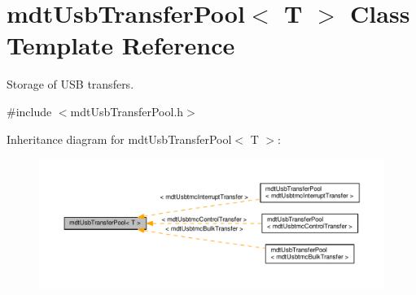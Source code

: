 \hypertarget{classmdt_usb_transfer_pool}{\section{mdt\-Usb\-Transfer\-Pool$<$ T $>$ Class Template Reference}
\label{classmdt_usb_transfer_pool}
}


Storage of U\-S\-B transfers.  




{\ttfamily \#include $<$mdt\-Usb\-Transfer\-Pool.\-h$>$}



Inheritance diagram for mdt\-Usb\-Transfer\-Pool$<$ T $>$\-:\nopagebreak
\begin{figure}[H]
\begin{center}
\leavevmode
\includegraphics[width=350pt]{classmdt_usb_transfer_pool__inherit__graph}
\end{center}
\end{figure}
